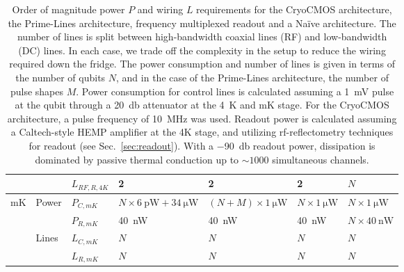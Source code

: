 {\begin{landscape}
\begin{table}
\begin{tabular}{|l|l|l|l|l|l|l|}
                        &                        & $L_{RF,R,4K}$ & 2                         & 2                        & 2   & $N$                 \\\hline
    \multirow{4}{*}{mK} & \multirow{2}{*}{Power} & $P_{C,mK}$ & $N\times\SI{6}{\pico\watt} + \SI{34}{\micro\watt}$ & $ (N+M)\times\SI{1}{\micro\watt}$ & $N\times\SI{1}{\micro\watt}$   & $N\times\SI{1}{\micro\watt}$                   \\\cline{3-7}
                        &                        & $P_{R,mK}$ & \SI{40}{\nano\watt}     & \SI{40}{\nano\watt}           &\SI{40}{\nano\watt}   & $N\times\SI{40}{\nano\watt}$ \\\cline{2-7}
                        & \multirow{2}{*}{Lines} & $L_{C,mK}$ & $N$                     & $N$                           & $N$ & $N$                 \\\cline{3-7}
                        &                        & $L_{R,mK}$ & $N$                     & $N$                           & $N$ & $N$                 \\\hline
    \end{tabular}
    \caption[Approximate power and wiring requirements for a QC]{Order of magnitude power $P$ and wiring $L$ requirements for the CryoCMOS architecture, the Prime-Lines architecture, frequency multiplexed readout and a Na\"ive architecture. The number of lines is split between high-bandwidth coaxial lines (RF) and low-bandwidth (DC) lines. In each case, we trade off the complexity in the setup to reduce the wiring required down the fridge. The power consumption and number of lines is given in terms of the number of qubits $N$, and in the case of the Prime-Lines architecture, the number of pulse shapes $M$. Power consumption for control lines is calculated assuming a \SI{1}{\milli\volt} pulse at the qubit through a \SI{20}{\decibel} attenuator at the \SI{4}{\kelvin} and mK stage. For the CryoCMOS architecture, a pulse frequency of \SI{10}{\mega\hertz} was used. Readout power is calculated assuming a Caltech-style HEMP amplifier at the 4K stage, and utilizing rf-reflectometry techniques for readout (see Sec.~\ref{sec:readout}). With a \SI{-90}{\decibel} readout power,
    dissipation is dominated by passive thermal conduction up to $\sim 1000$ simultaneous channels.}
    \label{tab:arch}
  \end{table}
\end{landscape}
}

